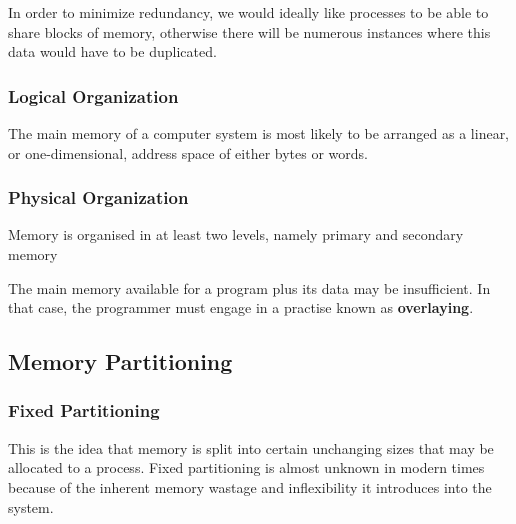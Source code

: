\documentclass[11pt]{article}
\begin{document}
In order to minimize redundancy, we would ideally like 
processes to be able to share blocks of memory, otherwise
there will be numerous instances where this data would have
to be duplicated.

\subsubsection{Logical Organization}
\label{sec:orgheadline4}

The main memory of a computer system is most likely to be
arranged as a linear, or one-dimensional, address space of
either bytes or words.

\subsubsection{Physical Organization}
\label{sec:orgheadline5}

Memory is organised in at least two levels, namely primary
and secondary memory

The main memory available for a program plus its data may be
insufficient. In that case, the programmer must engage in a
practise known as \textbf{overlaying}.

\subsection{Memory Partitioning}
\label{sec:orgheadline18}

\subsubsection{Fixed Partitioning}
\label{sec:orgheadline9}

This is the idea that memory is split into certain unchanging sizes
that may be allocated to a process. Fixed partitioning is almost
unknown in modern times because of the inherent memory wastage and
inflexibility it introduces into the system.
\end{document}
